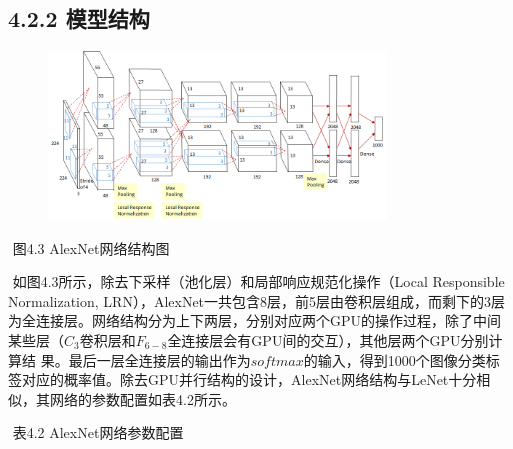 \subsection{4.2.2 模型结构}\label{ux6a21ux578bux7ed3ux6784-1}

\begin{figure}
\centering
\includegraphics[width=0.8\textwidth]{./img/ch4/alexnet.png}
\caption{}
\end{figure}

​ 图4.3 AlexNet网络结构图

​ 如图4.3所示，除去下采样（池化层）和局部响应规范化操作（Local
Responsible Normalization,
LRN），AlexNet一共包含8层，前5层由卷积层组成，而剩下的3层为全连接层。网络结构分为上下两层，分别对应两个GPU的操作过程，除了中间某些层（\(C_3\)卷积层和\(F_{6-8}\)全连接层会有GPU间的交互），其他层两个GPU分别计算结
果。最后一层全连接层的输出作为\(softmax\)的输入，得到1000个图像分类标签对应的概率值。除去GPU并行结构的设计，AlexNet网络结构与LeNet十分相似，其网络的参数配置如表4.2所示。

​ 表4.2 AlexNet网络参数配置

